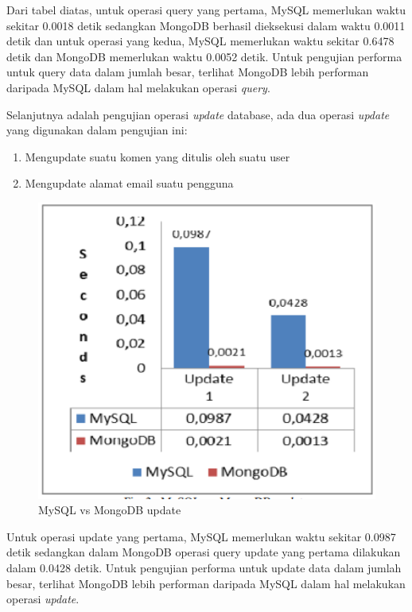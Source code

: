 Dari tabel diatas, untuk operasi query yang pertama, MySQL memerlukan waktu sekitar 0.0018 detik sedangkan MongoDB berhasil dieksekusi dalam waktu 0.0011 detik dan untuk operasi yang kedua, MySQL memerlukan waktu sekitar 0.6478 detik dan MongoDB memerlukan waktu 0.0052 detik. Untuk pengujian performa untuk query data dalam jumlah besar, terlihat MongoDB lebih performan daripada MySQL dalam hal melakukan operasi \textit{query}.

Selanjutnya adalah pengujian operasi \textit{update} database, ada dua operasi \textit{update} yang digunakan dalam pengujian ini:
\begin{enumerate}
	\item{Mengupdate suatu komen yang ditulis oleh suatu user}
	\item{Mengupdate alamat email suatu pengguna}
\end{enumerate}

\begin{figure}[H]
	\centering
	\includegraphics[keepaspectratio, width=12cm]{gambar/2-grafik-mongomysql-3}
	\caption{MySQL vs MongoDB update}
	\label{gambar:2-grafik-mongomysql-3}
\end{figure}

Untuk operasi update yang pertama, MySQL memerlukan waktu sekitar 0.0987 detik sedangkan dalam MongoDB operasi query update yang pertama dilakukan dalam 0.0428 detik. Untuk pengujian performa untuk update data dalam jumlah besar, terlihat MongoDB lebih performan daripada MySQL dalam hal melakukan operasi \textit{update}.

